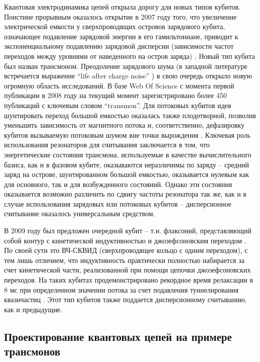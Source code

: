 \documentclass[14pt, a4paper]{extreport}
\numberwithin{equation}{section}
\begin{document}
Квантовая электродинамика цепей открыла дорогу для новых типов кубитов. Поистине прорывным оказалось открытие в 2007 году того, что увеличение электрической емкости у сверхпроводящих островов зарядового кубита, означающее подавление зарядовой энергии в его гамильтониане, приводит к экспоненциальному подавлению зарядовой дисперсии (зависимости частот переходов между уровнями от наведенного на остров заряда) \cite{koch2007charge}. Новый тип кубита был назван трансмоном. Преодоление зарядового шума (в западной литературе встречается выражение ``life after charge noise'' \cite{houck2009life}) в свою очередь открыло новую огромную область исследований. В базе Web Of Science с момента первой публикации в 2008 году на текущий момент зарегистрировано более 450 публикаций с ключевым словом ``transmon''. Для потоковых кубитов идея шунтировать переход большой емкостью оказалась также плодотворной, позволив уменьшить зависимость от магнитного потока и, соответственно, дефазировку кубитов вызываемую потоковым шумом вне точки вырождения \cite{you2007low, yan2016flux}. Ключевая роль использования резонаторов для считывания заключается в том, что энергетические состояния трансмона, используемые в качестве вычислительного базиса, как и в фазовом кубите, оказываются неразличимы по заряду -- средний заряд на острове, шунтированном большой емкостью, оказывается нулевым как для основного, так и для возбужденного состояний. Однако эти состояния оказывается возможно различить по сдвигу частоты резонатора так же, как и в случае использования зарядовых или потоковых кубитов -- дисперсионное считывание оказалось универсальным средством.

В 2009 году был предложен очередной кубит -- т.н. флаксоний, представляющий собой контур с кинетической индуктивностью и джозефсоновским переходом \cite{manucharyan2009fluxonium}. По своей сути это ВЧ-СКВИД (сверхпроводящее кольцо с одним переходом), с тем лишь отличием, что индуктивность практически полностью набирается за счет кинетической части, реализованной при помощи цепочки джозефсоновских переходов. На таких кубитах продемонстрировано рекордное время релаксации в 8 мс при определенном значении потока за счет подавления туннелирования квазичастиц \cite{pop2014coherent}. Этот тип кубитов также поддается дисперсионному считыванию, как и предыдущие.

\subsection{Проектирование квантовых цепей на примере трансмонов}
\end{document}
